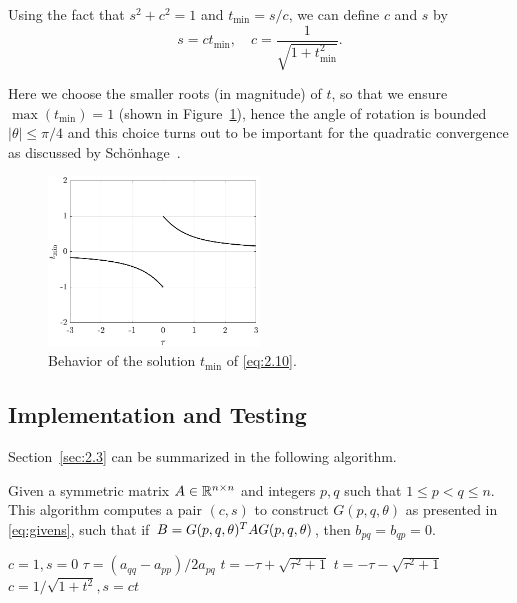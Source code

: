Using the fact that $s^2 + c^2 = 1$ and $t_{\mathrm{min}} = s/c$, we can define $c$ and $s$ by 
\begin{equation}\label{eq:2.12}
    s = ct_{\mathrm{min}},\quad c = \frac{1}{\sqrt{1+t_{\mathrm{min}}^2}}.
\end{equation}

Here we choose the smaller roots (in magnitude) of $t$, so that we ensure $\max(t_{\mathrm{min}}) = 1$ (shown in Figure~\ref{fig:1}), hence the angle of rotation is bounded $|\theta|\leq \pi/4$ and this choice turns out to be important for the quadratic convergence as discussed by Sch{\"o}nhage~.
\begin{figure}[ht]
    \centering
    \includegraphics[width=0.5\textwidth]{figs/tmin.pdf}
    \caption{Behavior of the solution $t_{\min}$ of \eqref{eq:2.10}.}
    \label{fig:1}
\end{figure}

\subsection{Implementation and Testing}
Section~\ref{sec:2.3} can be summarized in the following algorithm.
\begin{algorithm}[ht]
    \caption{Given a symmetric matrix $A\in \mathbb{R}^{n\times n}$ and integers $p,q$ such that $1\leq p < q\leq n$. This algorithm computes a pair $(c,s)$ to construct $G(p,q,\theta)$ as presented in \eqref{eq:givens}, such that if $B = G(p,q,\theta)^T A G(p,q,\theta)$, then $b_{pq} = b_{qp} = 0$.}
    \label{alg:jacobi-pair}
    \begin{algorithmic}[1]
            \State $c=1,s=0$
        \Else 
            \State $\tau = (a_{qq} - a_{pp})/2a_{pq}$
                \State $t=-\tau + \sqrt{\tau^2 +1}$
            \Else
                \State $t = -\tau - \sqrt{\tau^2 +1}$
            \EndIf
            \State $c = 1/\sqrt{1+t^2}, s = ct$
        \EndIf
    \end{algorithmic}
\end{algorithm}

